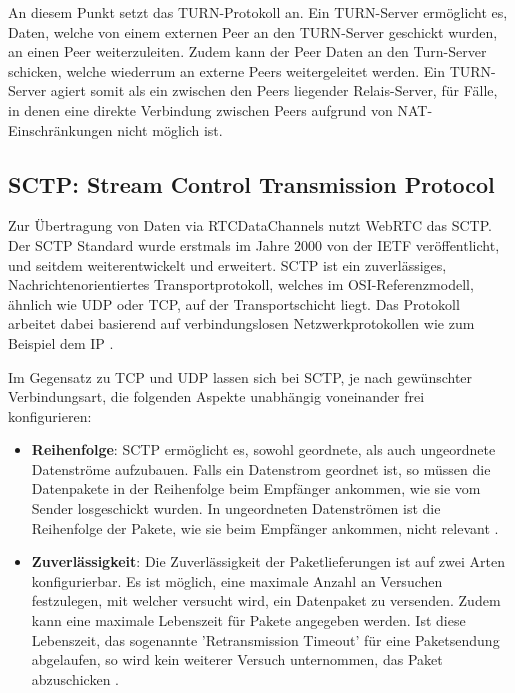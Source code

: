 An diesem Punkt setzt das \acf{TURN}-Protokoll an. Ein \acs{TURN}-Server ermöglicht es, Daten, welche von einem externen Peer an den \acs{TURN}-Server geschickt wurden, an einen Peer weiterzuleiten. Zudem kann der Peer Daten an den Turn-Server schicken, welche wiederrum an externe Peers weitergeleitet werden. Ein TURN-Server agiert somit als ein zwischen den Peers liegender Relais-Server, für Fälle, in denen eine direkte Verbindung zwischen Peers aufgrund von \acs{NAT}-Einschränkungen nicht möglich ist.

\subsection{SCTP: Stream Control Transmission Protocol}
Zur Übertragung von Daten via RTCDataChannels nutzt \acs{WebRTC} das \acf{SCTP}. Der \acs{SCTP} Standard wurde erstmals im Jahre 2000 von der \acs{IETF} veröffentlicht, und seitdem weiterentwickelt und erweitert. \acs{SCTP} ist ein zuverlässiges, Nachrichtenorientiertes Transportprotokoll, welches im \acf{OSI}-Referenzmodell, ähnlich wie \acs{UDP} oder \acs{TCP}, auf der Transportschicht liegt. Das Protokoll arbeitet dabei basierend auf verbindungslosen Netzwerkprotokollen wie zum Beispiel dem \acf{IP} \cite{sctpRFC}.\par

Im Gegensatz zu \acs{TCP} und \acs{UDP} lassen sich bei \acs{SCTP}, je nach gewünschter Verbindungsart, die folgenden Aspekte unabhängig voneinander frei konfigurieren:
\begin{itemize}
	\item\textbf{Reihenfolge}: \acs{SCTP} ermöglicht es, sowohl geordnete, als auch ungeordnete Datenströme aufzubauen. Falls ein Datenstrom geordnet ist, so müssen die Datenpakete in der Reihenfolge beim Empfänger ankommen, wie sie vom Sender losgeschickt wurden. In ungeordneten Datenströmen ist die Reihenfolge der Pakete, wie sie beim Empfänger ankommen, nicht relevant \cite{sctpRFC}.
	\item\textbf{Zuverlässigkeit}: Die Zuverlässigkeit der Paketlieferungen ist auf zwei Arten konfigurierbar. Es ist möglich, eine maximale Anzahl an Versuchen festzulegen, mit welcher versucht wird, ein Datenpaket zu versenden. Zudem kann eine maximale Lebenszeit für Pakete angegeben werden. Ist diese Lebenszeit, das sogenannte 'Retransmission Timeout' für eine Paketsendung abgelaufen, so wird kein weiterer Versuch unternommen, das Paket abzuschicken \cite{sctpRFC}.
\end{itemize}

